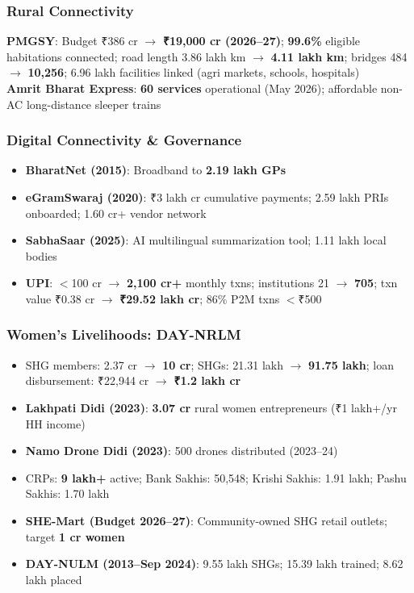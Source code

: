 \subsubsection*{Rural Connectivity}
\textbf{PMGSY}: Budget ₹386 cr $\rightarrow$ \textbf{₹19,000 cr (2026--27)}; \textbf{99.6\%} eligible habitations connected; road length 3.86 lakh km $\rightarrow$ \textbf{4.11 lakh km}; bridges 484 $\rightarrow$ \textbf{10,256}; 6.96 lakh facilities linked (agri markets, schools, hospitals)\\
\textbf{Amrit Bharat Express}: \textbf{60 services} operational (May 2026); affordable non-AC long-distance sleeper trains

\subsubsection*{Digital Connectivity \& Governance}
\begin{itemize}
  \item \textbf{BharatNet (2015)}: Broadband to \textbf{2.19 lakh GPs}
  \item \textbf{eGramSwaraj (2020)}: ₹3 lakh cr cumulative payments; 2.59 lakh PRIs onboarded; 1.60 cr+ vendor network
  \item \textbf{SabhaSaar (2025)}: AI multilingual summarization tool; 1.11 lakh local bodies
  \item \textbf{UPI}: $<$100 cr $\rightarrow$ \textbf{2,100 cr+} monthly txns; institutions 21 $\rightarrow$ \textbf{705}; txn value ₹0.38 cr $\rightarrow$ \textbf{₹29.52 lakh cr}; 86\% P2M txns $<$₹500
\end{itemize}

\subsubsection*{Women's Livelihoods: DAY-NRLM}
\begin{itemize}
  \item SHG members: 2.37 cr $\rightarrow$ \textbf{10 cr}; SHGs: 21.31 lakh $\rightarrow$ \textbf{91.75 lakh}; loan disbursement: ₹22,944 cr $\rightarrow$ \textbf{₹1.2 lakh cr}
  \item \textbf{Lakhpati Didi (2023)}: \textbf{3.07 cr} rural women entrepreneurs (₹1 lakh+/yr HH income)
  \item \textbf{Namo Drone Didi (2023)}: 500 drones distributed (2023--24)
  \item CRPs: \textbf{9 lakh+} active; Bank Sakhis: 50,548; Krishi Sakhis: 1.91 lakh; Pashu Sakhis: 1.70 lakh
  \item \textbf{SHE-Mart (Budget 2026--27)}: Community-owned SHG retail outlets; target \textbf{1 cr women}
  \item \textbf{DAY-NULM (2013--Sep 2024)}: 9.55 lakh SHGs; 15.39 lakh trained; 8.62 lakh placed
\end{itemize}

